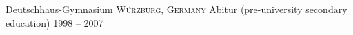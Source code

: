 
\headedsection %
{\href{https://www.deutschhaus.de/ }{Deutschhaus-Gymnasium}}%
{\textsc{W\"urzburg, Germany}}
{
\headedsubsection %
{Abitur \textnormal{(pre-university secondary education)}}
{1998 -- 2007}
 {}
}
